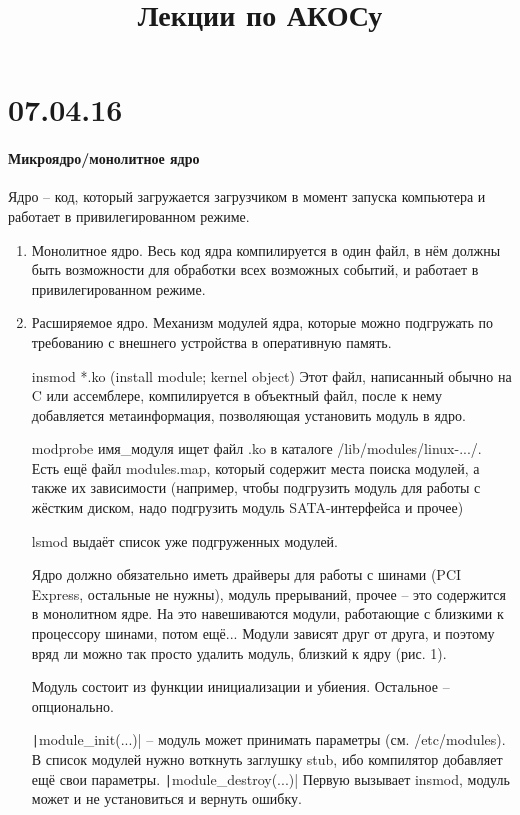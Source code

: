 \documentclass[a4paper,10pt]{article}
\title{\textbf{Лекции по АКОСу}}
\newcommand{\ci}{\texttt}
\begin{document}
\maketitle

\section{07.04.16}
\paragraph{Микроядро/монолитное ядро}
Ядро -- код, который загружается загрузчиком в момент запуска компьютера и работает в привилегированном режиме.
\begin{enumerate}
\item Монолитное ядро. Весь код ядра компилируется в один файл, в нём должны быть возможности для обработки всех возможных событий, и работает в привилегированном режиме.
\item Расширяемое ядро. Механизм модулей ядра, которые можно подгружать по требованию с внешнего устройства в оперативную память.

insmod *.ko (install module; kernel object)
Этот файл, написанный обычно на C или ассемблере, компилируется в объектный файл, после к нему добавляется метаинформация, позволяющая установить модуль в ядро.

modprobe имя\_модуля ищет файл .ko в каталоге /lib/modules/linux-.../. Есть ещё файл modules.map, который содержит места поиска модулей, а также их зависимости (например, чтобы подгрузить модуль для работы с жёстким диском, надо подгрузить модуль SATA-интерфейса и прочее)

lsmod выдаёт список уже подгруженных модулей.

Ядро должно обязательно иметь драйверы для работы с шинами (PCI Express, остальные не нужны), модуль прерываний, прочее -- это содержится в монолитном ядре. На это навешиваются модули, работающие с близкими к процессору шинами, потом ещё... Модули зависят друг от друга, и поэтому вряд ли можно так просто удалить модуль, близкий к ядру (рис. 1).

Модуль состоит из функции инициализации и убиения. Остальное -- опционально.

\ci|module_init(...)| -- модуль может принимать параметры (см. /etc/modules).
В список модулей нужно воткнуть заглушку stub, ибо компилятор добавляет ещё свои параметры.
\ci|module_destroy(...)|
Первую вызывает insmod, модуль может и не установиться и вернуть ошибку.


\end{enumerate}
\end{document}
